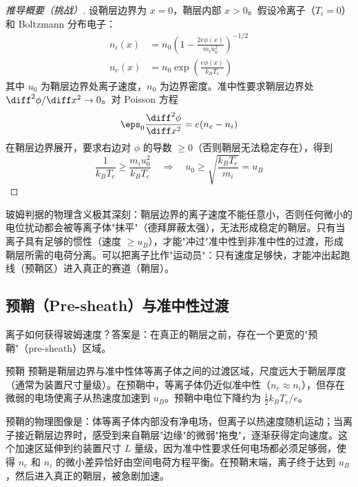 \begin{proof}[推导概要（挑战）]
设鞘层边界为 $x=0$，鞘层内部 $x>0$。假设冷离子（$T_i = 0$）和 Boltzmann 分布电子：
\begin{align}
n_i(x) &= n_0 \left(1 - \frac{2e\phi(x)}{m_i u_0^2}\right)^{-1/2} \\
n_e(x) &= n_0 \exp\!\left(\frac{e\phi(x)}{k_B T_e}\right)
\end{align}
其中 $u_0$ 为鞘层边界处离子速度，$n_0$ 为边界密度。准中性要求鞘层边界处 $\diff^2\phi/\diff x^2 \to 0$。对 Poisson 方程
\begin{equation}
\eps_0 \frac{\diff^2\phi}{\diff x^2} = e(n_e - n_i)
\end{equation}
在鞘层边界展开，要求右边对 $\phi$ 的导数 $\ge 0$（否则鞘层无法稳定存在），得到
\begin{equation}
\frac{1}{k_B T_e} \ge \frac{m_i u_0^2}{k_B T_e} \quad\Rightarrow\quad u_0 \ge \sqrt{\frac{k_B T_e}{m_i}} = u_B
\end{equation}
\end{proof}

\begin{insight}{}{}
玻姆判据的物理含义极其深刻：鞘层边界的离子速度不能任意小，否则任何微小的电位扰动都会被等离子体"抹平"（德拜屏蔽太强），无法形成稳定的鞘层。只有当离子具有足够的惯性（速度 $\ge u_B$），才能"冲过"准中性到非准中性的过渡，形成鞘层所需的电荷分离。可以把离子比作"运动员"：只有速度足够快，才能冲出起跑线（预鞘区）进入真正的赛道（鞘层）。
\end{insight}

\subsection{预鞘（Pre-sheath）与准中性过渡}

离子如何获得玻姆速度？答案是：在真正的鞘层之前，存在一个更宽的"预鞘"（pre-sheath）区域。

\begin{definition}{预鞘}{}{}
\label{def:pre-sheath}
预鞘是鞘层边界与准中性体等离子体之间的过渡区域，尺度远大于鞘层厚度（通常为装置尺寸量级）。在预鞘中，等离子体仍近似准中性（$n_e \approx n_i$），但存在微弱的电场使离子从热速度加速到 $u_B$。预鞘中电位下降约为 $\frac{1}{2}k_B T_e/e$。
\end{definition}

\begin{insight}{}{}
预鞘的物理图像是：体等离子体内部没有净电场，但离子以热速度随机运动；当离子接近鞘层边界时，感受到来自鞘层"边缘"的微弱"拖曳"，逐渐获得定向速度。这个加速区延伸到约装置尺寸 $L$ 量级，因为准中性要求任何电场都必须足够弱，使得 $n_e$ 和 $n_i$ 的微小差异恰好由空间电荷方程平衡。在预鞘末端，离子终于达到 $u_B$，然后进入真正的鞘层，被急剧加速。
\end{insight}


